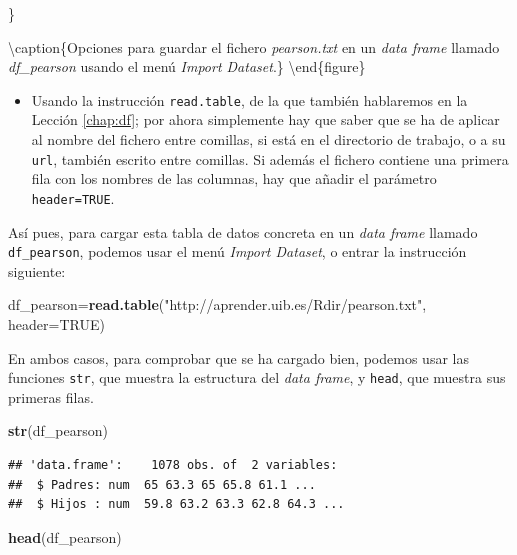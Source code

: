 \documentclass[]{book}
\newenvironment{Shaded}{\begin{snugshade}}{\end{snugshade}}
\newcommand{\DataTypeTok}[1]{\textcolor[rgb]{0.13,0.29,0.53}{#1}}
\newcommand{\KeywordTok}[1]{\textcolor[rgb]{0.13,0.29,0.53}{\textbf{#1}}}
\newcommand{\NormalTok}[1]{#1}
\newcommand{\OtherTok}[1]{\textcolor[rgb]{0.56,0.35,0.01}{#1}}
\newcommand{\StringTok}[1]{\textcolor[rgb]{0.31,0.60,0.02}{#1}}
\providecommand{\tightlist}{%
  \setlength{\itemsep}{0pt}\setlength{\parskip}{0pt}}
\theoremstyle{definition}
\theoremstyle{definition}
\theoremstyle{definition}
\theoremstyle{remark}
\begin{document}
\}

\textbackslash{}caption\{Opciones para guardar el fichero \emph{pearson.txt} en un \emph{data frame} llamado \emph{df\_pearson} usando el menú \emph{Import Dataset}.\}\label{fig:guardpearson}
\textbackslash{}end\{figure\}

\begin{itemize}
\tightlist
\item
  Usando la instrucción \texttt{read.table}, de la que también hablaremos en la Lección \ref{chap:df}; por ahora simplemente hay que saber que se ha de aplicar al nombre del fichero entre comillas, si está en el directorio de trabajo, o a su \texttt{url}, también escrito entre comillas. Si además el fichero contiene una primera fila con los nombres de las columnas, hay que añadir el parámetro \texttt{header=TRUE}.
\end{itemize}

Así pues, para cargar esta tabla de datos concreta en un \emph{data frame} llamado \texttt{df\_pearson}, podemos usar el menú \emph{Import Dataset}, o entrar la instrucción siguiente:

\begin{Shaded}
\begin{Highlighting}[]
\NormalTok{df_pearson=}\KeywordTok{read.table}\NormalTok{(}\StringTok{"http://aprender.uib.es/Rdir/pearson.txt"}\NormalTok{, }\DataTypeTok{header=}\OtherTok{TRUE}\NormalTok{)}
\end{Highlighting}
\end{Shaded}

En ambos casos, para comprobar que se ha cargado bien, podemos usar las funciones \texttt{str}, que muestra la estructura del \emph{data frame}, y \texttt{head}, que muestra sus primeras filas.

\begin{Shaded}
\begin{Highlighting}[]
\KeywordTok{str}\NormalTok{(df_pearson)}
\end{Highlighting}
\end{Shaded}

\begin{verbatim}
## 'data.frame':    1078 obs. of  2 variables:
##  $ Padres: num  65 63.3 65 65.8 61.1 ...
##  $ Hijos : num  59.8 63.2 63.3 62.8 64.3 ...
\end{verbatim}

\begin{Shaded}
\begin{Highlighting}[]
\KeywordTok{head}\NormalTok{(df_pearson)}
\end{Highlighting}
\end{Shaded}
\end{document}
